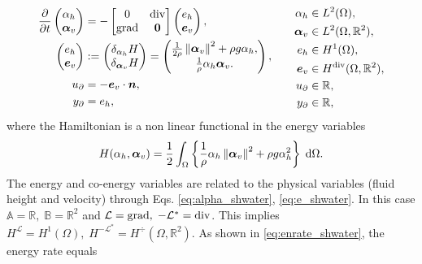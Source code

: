 \begin{equation}
\begin{aligned}
\diffp{}{t}
\begin{pmatrix}
\alpha_h \\
\bm{\alpha}_v \\
\end{pmatrix} &= -
\begin{bmatrix}
0 & \div \\
\grad & \bm{0}
\end{bmatrix}
\begin{pmatrix}
e_h \\
\bm{e}_v \\
\end{pmatrix}, \\
\begin{pmatrix}
e_h  \\
\bm{e}_v
\end{pmatrix}
&:=
\begin{pmatrix}
\delta_{\alpha_h} H\\
\delta_{\bm{\alpha}_v} H
\end{pmatrix} = 
\begin{pmatrix}
\frac{1}{2 \rho} \norm{\bm{\alpha}_v}^2 + \rho g \alpha_h, \\
\frac{1}{\rho} \alpha_h \bm{\alpha}_v.
\end{pmatrix}, \\
{u}_\partial &= - \bm{e}_v \cdot\bm{n}, \\
{y}_\partial &= {e}_h, \\
\end{aligned} \qquad 
\begin{aligned}
\alpha_h &\in L^2(\Omega), \\
\bm{\alpha}_v &\in L^2(\Omega, \mathbb{R}^2), \\
e_h &\in H^1(\Omega), \\
\bm{e}_v &\in H^{\div}(\Omega, \mathbb{R}^2), \\
u_\partial &\in \mathbb{R}, \\
y_\partial &\in \mathbb{R},
\end{aligned}
\end{equation} 
where the Hamiltonian is a non linear functional in the energy variables 
\begin{equation*}
H(\alpha_h, \bm{\alpha}_v) = \energy{\frac{1}{\rho} \alpha_h \norm{\bm{\alpha}_v}^2 + \rho g \alpha_h^2}.
\end{equation*}
The energy and co-energy variables are related to the physical variables (fluid height and velocity) through Eqs. \eqref{eq:alpha_shwater}, \eqref{eq:e_shwater}. In this case $\mathbb{A} = \mathbb{R},\; \mathbb{B} = \mathbb{R}^2$ and $\mathcal{L} = \operatorname*{grad}, \; -\mathcal{L}^* = \operatorname{div}$. This implies $H^{\mathcal{L}} = H^1(\Omega), \; H^{-\mathcal{L}^*} = H^{\div}(\Omega, \mathbb{R}^2)$. As shown in \eqref{eq:enrate_shwater}, the energy rate equals
